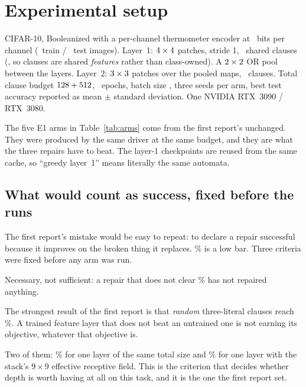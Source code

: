 \section{Experimental setup}
\label{sec:setup}

 CIFAR-10, Booleanized with a per-channel thermometer encoder at
\nBits\ bits per channel (\nTrain\ train / \nTest\ test images). Layer~1: $4\times4$
patches, stride 1, \cOne\ shared clauses (, so clauses are
shared \emph{features} rather than class-owned). A $2\times2$ OR pool between the
layers. Layer~2: $3\times3$ patches over the pooled maps, \cTwo\ clauses. Total clause
budget $128+512$, \epochsRun\ epochs, batch size \batchSize, three seeds per arm, best test
accuracy reported as mean $\pm$ standard deviation. One NVIDIA RTX~3090 / RTX~3080.

 The five E1 arms in Table~\ref{tab:arms} come
from the first report's  unchanged. They were produced by the same driver
at the same budget, and they are what the three repairs have to beat. The layer-1 checkpoints
are reused from the same cache, so ``greedy layer~1'' means literally the same automata.

\subsection{What would count as success, fixed before the runs}
\label{sec:criteria}

The first report's mistake would be easy to repeat: to declare a repair successful because it
improves on the broken thing it replaces. \accMctm{}\% is a low bar. Three criteria were
fixed before any arm was run.

\begin{ttkey}
 Necessary, not sufficient: a repair that does not clear
\accMctm{}\% has not repaired anything.

 The strongest result of the first report is that
\emph{random} three-literal clauses reach \accMctmRandom{}\%. A trained feature layer that does
not beat an untrained one is not earning its objective, whatever that objective is.

 Two of them: \accSingleMatched{}\%
for one layer of the same total size and \accSingleRf{}\% for one layer with the stack's
$9\times9$ effective receptive field. This is the criterion that decides whether depth is worth
having at all on this task, and it is the one the first report set.
\end{ttkey}

